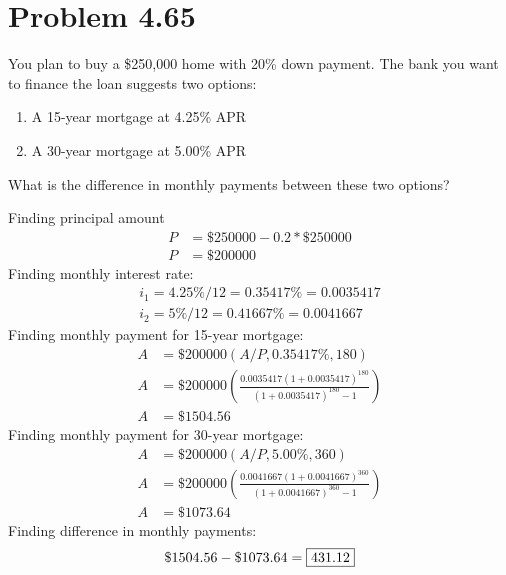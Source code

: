 \documentclass[../INDE250HW.tex]{subfiles}
\begin{document}
\newpage
\section*{Problem 4.65}
\begin{exrc}
    You plan to buy a \$250,000 home with 20\% down payment. The bank you want to finance the loan suggests two options:
    \begin{enumerate}
        \item A 15-year mortgage at 4.25\% APR
        \item A 30-year mortgage at 5.00\% APR
    \end{enumerate}
    What is the difference in monthly payments between these two options?
\end{exrc}
Finding principal amount
\begin{equation*}
    \begin{aligned}
        P &= \$250000 - 0.2 * \$250000 \\
        P &= \$200000
    \end{aligned}
\end{equation*}
Finding monthly interest rate:
\begin{equation*}
    \begin{aligned}
        i_1 = 4.25\%/12 = 0.35417\% = 0.0035417 \\
        i_2 = 5\%/12 = 0.41667\% = 0.0041667
    \end{aligned}
\end{equation*}
Finding monthly payment for 15-year mortgage:
\begin{equation*}
    \begin{aligned}
        A &= \$200000(A/P,0.35417\%,180) \\
        A &= \$200000\left(\frac{0.0035417(1+0.0035417)^{180}}{(1+0.0035417)^{180}-1}\right) \\
        A &= \$1504.56
    \end{aligned}
\end{equation*} 
Finding monthly payment for 30-year mortgage:
\begin{equation*}
    \begin{aligned}
        A &= \$200000(A/P,5.00\%,360) \\
        A &= \$200000\left(\frac{0.0041667(1+0.0041667)^{360}}{(1+0.0041667)^{360}-1}\right) \\
        A &= \$1073.64
    \end{aligned}
\end{equation*}
Finding difference in monthly payments:
\begin{equation*}
    \begin{aligned}
        \$1504.56 - \$1073.64 = \framebox{$431.12$}
    \end{aligned}
\end{equation*}
\end{document}
